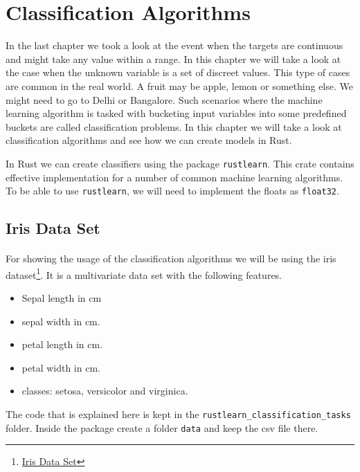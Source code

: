 \documentclass{book}
\begin{document}
\section{Classification Algorithms}%

In the last chapter we took a look at the event when the targets are continuous and might take any value within a range. In this chapter we will take a look at the case when the unknown variable is a set of discreet values. This type of cases are common in the real world. A fruit may be apple, lemon or something else. We might need to go to Delhi or Bangalore. Such scenarios where the machine learning algorithm is tasked with bucketing input variables into some predefined buckets are called classification problems. In this chapter we will take a look at classification algorithms and see how we can create models in Rust.

In Rust we can create classifiers using the package \lstinline{rustlearn}. This crate contains effective implementation for a number of common machine learning algorithms. To be able to use \lstinline{rustlearn}, we will need to implement the floats as \lstinline{float32}.

\subsection{Iris Data Set}%

\paragraph{}%
For showing the usage of the classification algorithms we will be using the iris dataset\footnote{\href{https://archive.ics.uci.edu/ml/datasets/iris}{Iris Data Set}}. It is a multivariate data set with the following features.

\begin{itemize}
	\item Sepal length in cm
	\item sepal width in cm.
	\item petal length in cm.
	\item petal width in cm.
	\item classes: setosa, versicolor and virginica.
\end{itemize}

The code that is explained here is kept in the \lstinline{rustlearn_classification_tasks} folder. Inside the package create a folder \lstinline{data} and keep the csv file there.
\label{par:}
\end{document}
